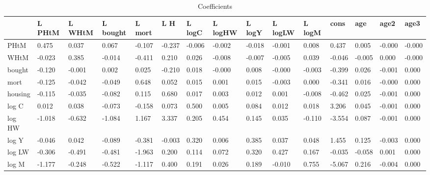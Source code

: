 \begin{table}[htbp]
\caption{\label{clabel} Coefficients}\centering\medskip
\begin{tabular}{lllllllllllllll} \hline \hline
 & L PHtM  & L WHtM  & L bought  & L mort  & L H  & L logC  & L logHW  & L logY  & L logLW  & L logM  & cons  & age  & age2  & age3  \\  \hline 
PHtM &     0.475 &     0.037 &     0.067 &    -0.107 &    -0.237 &    -0.006 &    -0.002 &    -0.018 &    -0.001 &     0.008 &     0.437 &     0.005 &    -0.000 &    -0.000 \\  
WHtM &    -0.023 &     0.385 &    -0.014 &    -0.411 &     0.210 &     0.026 &    -0.008 &    -0.007 &    -0.005 &     0.039 &    -0.046 &    -0.005 &     0.000 &    -0.000 \\  
bought &    -0.120 &    -0.001 &     0.002 &     0.025 &    -0.210 &     0.018 &    -0.000 &     0.008 &    -0.000 &    -0.003 &    -0.399 &     0.026 &    -0.001 &     0.000 \\  
mort &    -0.125 &    -0.042 &    -0.049 &     0.648 &     0.052 &     0.015 &     0.001 &     0.015 &    -0.003 &     0.000 &    -0.341 &     0.016 &    -0.000 &     0.000 \\  
housing &    -0.115 &    -0.035 &    -0.082 &     0.115 &     0.680 &     0.017 &     0.003 &     0.012 &     0.001 &    -0.008 &    -0.462 &     0.025 &    -0.001 &     0.000 \\  
log C &     0.012 &     0.038 &    -0.073 &    -0.158 &     0.073 &     0.500 &     0.005 &     0.084 &     0.012 &     0.018 &     3.206 &     0.045 &    -0.001 &     0.000 \\  
log HW &    -1.018 &    -0.632 &    -1.084 &     1.167 &     3.337 &     0.205 &     0.454 &     0.145 &     0.035 &    -0.110 &    -3.554 &     0.087 &    -0.001 &     0.000 \\  
log Y &    -0.046 &     0.042 &    -0.089 &    -0.381 &    -0.003 &     0.320 &     0.006 &     0.385 &     0.037 &     0.048 &     1.455 &     0.125 &    -0.003 &     0.000 \\  
log LW &    -0.306 &    -0.491 &    -0.481 &    -1.963 &     0.200 &     0.114 &     0.072 &     0.320 &     0.427 &     0.167 &    -0.035 &    -0.058 &     0.001 &     0.000 \\  
log M &    -1.177 &    -0.248 &    -0.522 &    -1.117 &     0.400 &     0.191 &     0.026 &     0.189 &    -0.010 &     0.755 &    -5.067 &     0.216 &    -0.004 &     0.000 \\  
\hline \hline \end{tabular}
\end{table}
